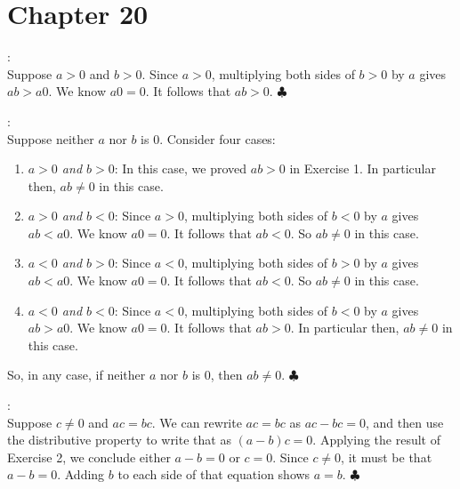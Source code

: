     \section*{Chapter 20}
    
\begin{Solution}{20.1}
:\\
Suppose $a>0$ and $b>0$. Since $a>0$, multiplying both sides of $b>0$ by $a$ gives $ab>a0$. We know $a0 = 0$. It follows that $ab>0$. $\clubsuit$\\[3pt]


\end{Solution}

\begin{Solution}{20.2}

:\\
Suppose neither $a$ nor $b$ is $0$. Consider four cases:
\begin{enumerate}

\item {\it $a>0$ and $b>0$}: In this case, we proved $ab>0$ in Exercise 1. In particular then, $ab\not=0$ in this case.

\item {\it $a>0$ and $b<0$}:  Since $a>0$, multiplying both sides of $b<0$ by $a$ gives $ab<a0$. We know $a0 = 0$. It follows that $ab<0$. So $ab\not = 0$ in this case.

\item {\it $a<0$ and $b>0$}: Since $a<0$, multiplying both sides of $b>0$ by $a$ gives $ab<a0$. We know $a0 = 0$. It follows that $ab<0$. So $ab\not = 0$ in this case.

\item {\it $a<0$ and $b<0$}: Since $a<0$, multiplying both sides of $b<0$ by $a$ gives $ab>a0$. We know $a0 = 0$. It follows that $ab>0$. In particular then, $ab\not=0$ in this case.
\end{enumerate}
So, in any case, if neither $a$ nor $b$ is $0$, then $ab\not =0$. $\clubsuit$\\[5pt]


\end{Solution}

\begin{Solution}{20.3}
:\\
Suppose $c\not= 0$ and $ac = bc$. We can rewrite $ac = bc$ as $ac - bc = 0$, and then use the distributive property to write that as $(a-b)c = 0$. Applying the result of Exercise 2, we conclude either $a-b = 0$ or $c=0$.
Since $c\not =0$, it must be that $a-b = 0$. Adding $b$ to each side of that equation shows $a=b$. $\clubsuit$

\end{Solution}


